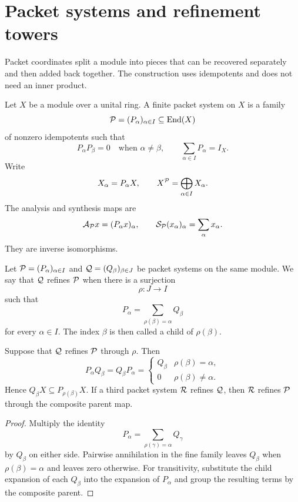 \section{Packet systems and refinement towers}\label{sec:refinement}

Packet coordinates split a module into pieces that can be recovered separately and then added back together. The construction uses idempotents and does not need an inner product.

\begin{definition}\label{def:packet_system}
Let $X$ be a module over a unital ring.  A finite packet system on $X$ is a family
\[
\mathcal P=(P_\alpha)_{\alpha\in I}
\subseteq\operatorname{End}(X)
\]
of nonzero idempotents such that
\[
P_\alpha P_\beta=0
\quad\text{when }\alpha\ne\beta,
\qquad
\sum_{\alpha\in I}P_\alpha=I_X.
\]
Write
\[
X_\alpha=P_\alpha X,
\qquad
X^{\mathcal P}=\bigoplus_{\alpha\in I}X_\alpha.
\]
The analysis and synthesis maps are
\[
\mathcal A_{\mathcal P}x=(P_\alpha x)_\alpha,
\qquad
\mathcal S_{\mathcal P}(x_\alpha)_\alpha=\sum_\alpha x_\alpha.
\]
They are inverse isomorphisms.
\end{definition}

\begin{definition}[Refinement]\label{def:refinement}\label{def:refinement-map}
Let $\mathcal P=(P_\alpha)_{\alpha\in I}$ and $\mathcal Q=(Q_\beta)_{\beta\in J}$ be packet systems on the same module.  We say that $\mathcal Q$ refines $\mathcal P$ when there is a surjection
\[
\rho:J\longrightarrow I
\]
such that
\[
P_\alpha=\sum_{\rho(\beta)=\alpha}Q_\beta
\]
for every $\alpha\in I$.  The index $\beta$ is then called a child of $\rho(\beta)$.
\end{definition}

\begin{theorem}\label{thm:children_transitivity}\label{thm:nested-refinement}
Suppose that $\mathcal Q$ refines $\mathcal P$ through $\rho$.  Then
\[
P_\alpha Q_\beta
=
Q_\beta P_\alpha
=
\begin{cases}
Q_\beta & \rho(\beta)=\alpha,\\
0 & \rho(\beta)\ne\alpha.
\end{cases}
\]
Hence $Q_\beta X\subseteq P_{\rho(\beta)}X$.  If a third packet system $\mathcal R$ refines $\mathcal Q$, then $\mathcal R$ refines $\mathcal P$ through the composite parent map.
\end{theorem}

\begin{proof}
Multiply the identity
\[
P_\alpha=\sum_{\rho(\gamma)=\alpha}Q_\gamma
\]
by $Q_\beta$ on either side.  Pairwise annihilation in the fine family leaves $Q_\beta$ when $\rho(\beta)=\alpha$ and leaves zero otherwise.  For transitivity, substitute the child expansion of each $Q_\beta$ into the expansion of $P_\alpha$ and group the resulting terms by the composite parent.
\end{proof}

